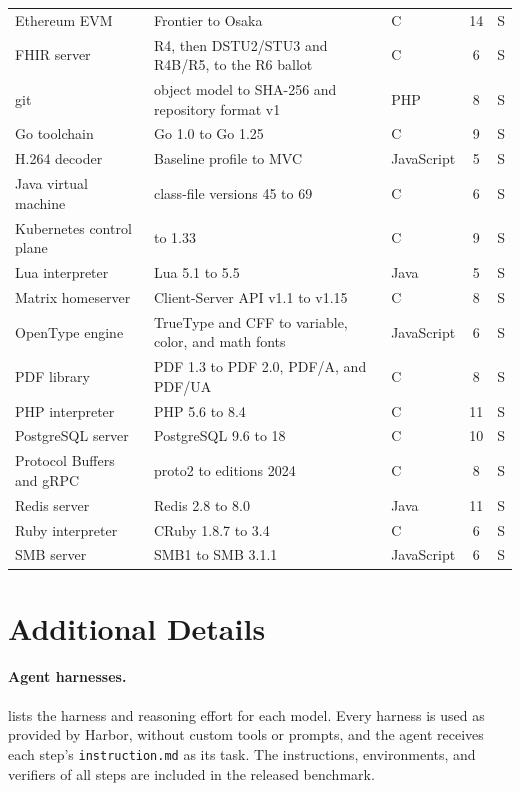 \documentclass{article}
\begin{document}
{\begin{longtable}{@{}>{\raggedright\arraybackslash}p{3.8cm} >{\raggedright\arraybackslash}p{8.6cm} l c c@{}}
  Ethereum EVM & Frontier to Osaka & C & 14 & S \\
  FHIR server & R4, then DSTU2/STU3 and R4B/R5, to the R6 ballot & C & 6 & S \\
  git & object model to SHA-256 and repository format v1 & PHP & 8 & S \\
  Go toolchain & Go 1.0 to Go 1.25 & C & 9 & S \\
  H.264 decoder & Baseline profile to MVC & JavaScript & 5 & S \\
  Java virtual machine & class-file versions 45 to 69 & C & 6 & S \\
  Kubernetes control plane & 1.25 to 1.33 & C & 9 & S \\
  Lua interpreter & Lua 5.1 to 5.5 & Java & 5 & S \\
  Matrix homeserver & Client-Server API v1.1 to v1.15 & C & 8 & S \\
  OpenType engine & TrueType and CFF to variable, color, and math fonts & JavaScript & 6 & S \\
  PDF library & PDF 1.3 to PDF 2.0, PDF/A, and PDF/UA & C & 8 & S \\
  PHP interpreter & PHP 5.6 to 8.4 & C & 11 & S \\
  PostgreSQL server & PostgreSQL 9.6 to 18 & C & 10 & S \\
  Protocol Buffers and gRPC & proto2 to editions 2024 & C & 8 & S \\
  Redis server & Redis 2.8 to 8.0 & Java & 11 & S \\
  Ruby interpreter & CRuby 1.8.7 to 3.4 & C & 6 & S \\
  SMB server & SMB1 to SMB 3.1.1 & JavaScript & 6 & S \\
\end{longtable}
}

\section{Additional Details}
\label{app:details}

\paragraph{Agent harnesses.}
 lists the harness and reasoning effort for each model. Every
harness is used as provided by Harbor, without custom tools or prompts, and the
agent receives each step's \texttt{instruction.md} as its task. The
instructions, environments, and verifiers of all steps are included in the
released benchmark.
\end{document}
